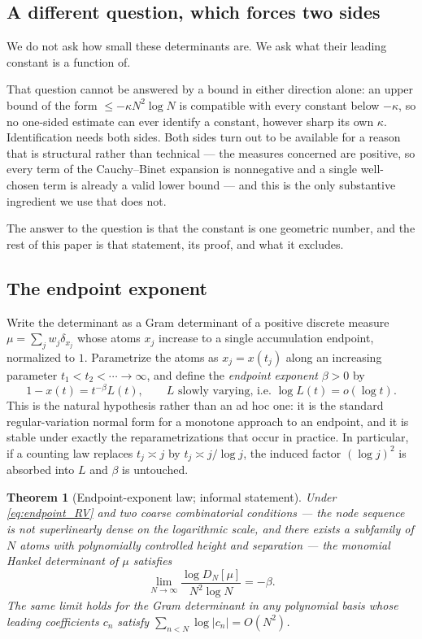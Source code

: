 \documentclass[11pt]{amsart}
\numberwithin{equation}{section}
\theoremstyle{plain}
\newtheorem{theorem}{Theorem}[section]
\theoremstyle{definition}
\theoremstyle{remark}
\begin{document}
\subsection{A different question, which forces two sides}

We do not ask how small these determinants are. We ask what their leading constant is a function of.

That question cannot be answered by a bound in either direction alone: an upper bound of the form
$\le-\kappa N^{2}\log N$ is compatible with every constant below $-\kappa$, so no one-sided estimate
can ever identify a constant, however sharp its own $\kappa$. Identification needs both sides. Both
sides turn out to be available for a reason that is structural rather than technical --- the measures
concerned are positive, so every term of the Cauchy--Binet expansion is nonnegative and a single
well-chosen term is already a valid lower bound --- and this is the only substantive ingredient we
use that \cite{HaynesZudilin2015} does not.

The answer to the question is that the constant is one geometric number, and the rest of this paper
is that statement, its proof, and what it excludes.

\subsection{The endpoint exponent}

Write the determinant as a Gram determinant of a positive discrete measure
$\mu=\sum_{j}w_{j}\delta_{x_{j}}$ whose atoms $x_{j}$ increase to a single accumulation endpoint,
normalized to $1$. Parametrize the atoms as $x_{j}=x(t_{j})$ along an increasing parameter
$t_{1}<t_{2}<\cdots\to\infty$, and define the \emph{endpoint exponent} $\beta>0$ by
\begin{equation}
1-x(t)=t^{-\beta}L(t),\qquad L \text{ slowly varying, i.e. } \log L(t)=o(\log t).
\label{eq:endpoint_RV}
\end{equation}
This is the natural hypothesis rather than an ad hoc one: it is the standard regular-variation
normal form for a monotone approach to an endpoint, and it is stable under exactly the
reparametrizations that occur in practice. In particular, if a counting law replaces $t_{j}\asymp j$
by $t_{j}\asymp j/\log j$, the induced factor $(\log j)^{2}$ is absorbed into $L$ and $\beta$ is
untouched.

\begin{theorem}[Endpoint-exponent law; informal statement]
Under \eqref{eq:endpoint_RV} and two coarse combinatorial conditions --- the node sequence is not
superlinearly dense on the logarithmic scale, and there exists a subfamily of $N$ atoms with
polynomially controlled height and separation --- the monomial Hankel determinant of $\mu$ satisfies
\[
\lim_{N\to\infty}\frac{\log D_{N}[\mu]}{N^{2}\log N}=-\beta .
\]
The same limit holds for the Gram determinant in any polynomial basis whose leading coefficients
$c_{n}$ satisfy $\sum_{n<N}\log|c_{n}|=O(N^{2})$.
\end{theorem}
\end{document}
